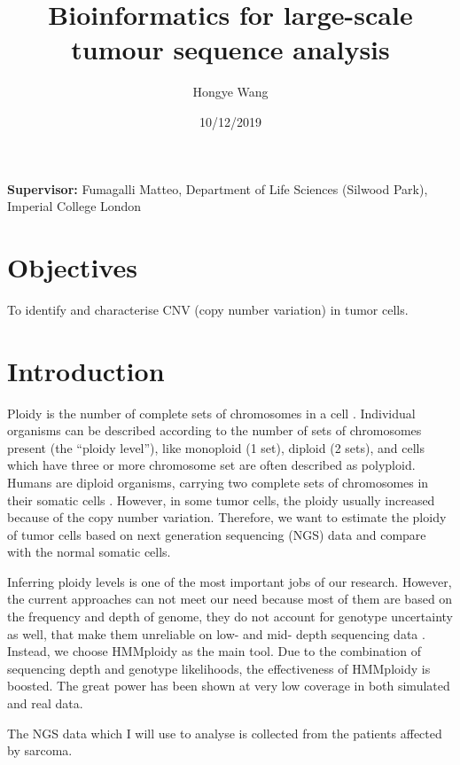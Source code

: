 \documentclass[11pt]{article}
\title{\textbf{Bioinformatics for large-scale tumour sequence analysis}}
\author[]{Hongye Wang}
\affil[]{Imperial College London}
\date{10/12/2019}
\begin{document}
  \maketitle

\section*{}
\begin{center}
	\textbf{Supervisor:} Fumagalli Matteo, Department of Life Sciences (Silwood Park), Imperial College London
\end{center}


\newpage

\section*{Objectives}
To identify and characterise CNV (copy number variation) in tumor cells.

\section*{Introduction}
\begin{linenumbers}
Ploidy is the number of complete sets of chromosomes in a cell \cite{malhotra2015ploidy}. Individual organisms can be described according to the number of sets of chromosomes present (the “ploidy level”), like monoploid (1 set), diploid (2 sets), and cells which have three or more chromosome set are often described as polyploid. Humans are diploid organisms, carrying two complete sets of chromosomes in their somatic cells \cite{margarido2015conpade}. However, in some tumor cells, the ploidy usually increased because of the copy number variation. Therefore, we want to estimate the ploidy of tumor cells based on next generation sequencing (NGS) data and compare with the normal somatic cells.

Inferring ploidy levels is one of the most important jobs of our research. However, the current approaches can not meet our need because most of them are based on the frequency and depth of genome, they do not account for genotype uncertainty as well, that make them unreliable on low- and mid- depth sequencing data \cite{margarido2015conpade}. Instead, we choose HMMploidy as the main tool. Due to the combination of sequencing depth and genotype likelihoods, the effectiveness of HMMploidy is boosted. The great power has been shown at very low coverage in both simulated and real data.

The NGS data which I will use to analyse is collected from the patients affected by sarcoma. 

\end{linenumbers}
\end{document}
